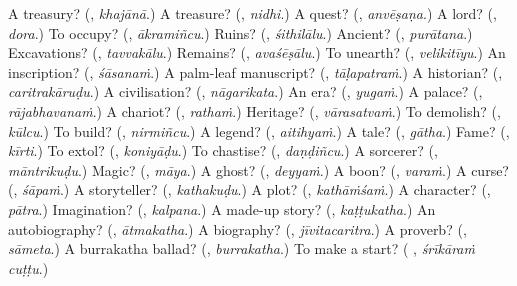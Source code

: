 \begin{tcolorbox}[breakable,colback=teal!4,colframe=teal!35!black,title={Before you move on}]
A treasury? (\textbf{}, \emph{khajānā}.) A treasure? (\textbf{}, \emph{nidhi}.) A quest? (\textbf{}, \emph{anvēṣaṇa}.) A lord? (\textbf{}, \emph{dora}.) To occupy? (\textbf{}, \emph{ākramiñcu}.) Ruins? (\textbf{}, \emph{śithilālu}.) Ancient? (\textbf{}, \emph{purātana}.) Excavations? (\textbf{}, \emph{tavvakālu}.) Remains? (\textbf{}, \emph{avaśēṣālu}.) To unearth? (\textbf{}, \emph{velikitīyu}.) An inscription? (\textbf{}, \emph{śāsanaṁ}.) A palm-leaf manuscript? (\textbf{}, \emph{tāḷapatraṁ}.) A historian? (\textbf{}, \emph{caritrakāruḍu}.) A civilisation? (\textbf{}, \emph{nāgarikata}.) An era? (\textbf{}, \emph{yugaṁ}.) A palace? (\textbf{}, \emph{rājabhavanaṁ}.) A chariot? (\textbf{}, \emph{rathaṁ}.) Heritage? (\textbf{}, \emph{vārasatvaṁ}.) To demolish? (\textbf{}, \emph{kūlcu}.) To build? (\textbf{}, \emph{nirmiñcu}.) A legend? (\textbf{}, \emph{aitihyaṁ}.) A tale? (\textbf{}, \emph{gātha}.) Fame? (\textbf{}, \emph{kīrti}.) To extol? (\textbf{}, \emph{koniyāḍu}.) To chastise? (\textbf{}, \emph{daṇḍiñcu}.) A sorcerer? (\textbf{}, \emph{māntrikuḍu}.) Magic? (\textbf{}, \emph{māya}.) A ghost? (\textbf{}, \emph{deyyaṁ}.) A boon? (\textbf{}, \emph{varaṁ}.) A curse? (\textbf{}, \emph{śāpaṁ}.) A storyteller? (\textbf{}, \emph{kathakuḍu}.) A plot? (\textbf{}, \emph{kathāṁśaṁ}.) A character? (\textbf{}, \emph{pātra}.) Imagination? (\textbf{}, \emph{kalpana}.) A made-up story? (\textbf{}, \emph{kaṭṭukatha}.) An autobiography? (\textbf{}, \emph{ātmakatha}.) A biography? (\textbf{}, \emph{jīvitacaritra}.) A proverb? (\textbf{}, \emph{sāmeta}.) A burrakatha ballad? (\textbf{}, \emph{burrakatha}.) To make a start? (\textbf{ }, \emph{śrīkāraṁ cuṭṭu}.)
\end{tcolorbox}
